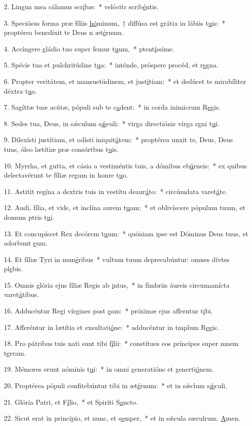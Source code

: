 2. Lingua mea cálamus scr\uline{i}bæ:~* velócitr scrib\uline{é}ntis.\par 
3. Speciósus forma præ fíliis \uline{hó}minum,~† diffúsa est grátia in lábiis t\uline{u}is:~* proptérea benedíxit te Deus n æt\uline{é}rnum.\par 
4. Accíngere gládio tuo super femur t\uline{u}um,~* ptent\uline{í}ssime.\par 
5. Spécie tua et pulchritúdine t\uline{u}a:~* inténde, próspere procéd, et r\uline{e}gna.\par 
6. Propter veritátem, et mansuetúdinem, et just\uline{í}tiam:~* et dedúcet te mirabíliter déxtra t\uline{u}a.\par 
7. Sagíttæ tuæ acútæ, pópuli sub te c\uline{a}dent:~* in corda inimicrum R\uline{e}gis.\par 
8. Sedes tua, Deus, in sǽculum s\uline{ǽ}culi:~* virga directiónis virga rgni t\uline{u}i.\par 
9. Dilexísti justítiam, et odísti iniquit\uline{á}tem:~* proptérea unxit te, Deus, Deus tuus, óleo lætítiæ præ consórtbus t\uline{u}is.\par 
10. Myrrha, et gutta, et cásia a vestiméntis tuis, a dómibus eb\uline{ú}rneis:~* ex quibus delectavérunt te fíliæ regum in honre t\uline{u}o.\par 
11. Astitit regína a dextris tuis in vestítu deaur\uline{á}to:~* circúmdata varet\uline{á}te.\par 
12. Audi, fília, et vide, et inclína aurem t\uline{u}am:~* et oblivíscere pópulum tuum, et domum ptris t\uline{u}i.\par 
13. Et concupíscet Rex decórem t\uline{u}um:~* quóniam ipse est Dóminus Deus tuus, et adorbunt \uline{e}um.\par 
14. Et fíliæ Tyri in mun\uline{é}ribus~* vultum tuum deprecabúntur: omnes dívtes pl\uline{e}bis.\par 
15. Omnis glória ejus fíliæ Regis ab \uline{i}ntus,~* in fímbriis áureis circumamícta varet\uline{á}tibus.\par 
16. Adducéntur Regi vírgines post \uline{e}am:~* próximæ ejus afferntur t\uline{i}bi.\par 
17. Afferéntur in lætítia et exsultati\uline{ó}ne:~* adducéntur in tmplum R\uline{e}gis.\par 
18. Pro pátribus tuis nati sunt tibi f\uline{í}lii:~* constítues eos príncipes super mnem t\uline{e}rram.\par 
19. Mémores erunt nóminis t\uline{u}i:~* in omni generatióne et generti\uline{ó}nem.\par 
20. Proptérea pópuli confitebúntur tibi in æt\uline{é}rnum:~* et in sǽclum s\uline{ǽ}culi.\par 
21. Glória Patri, et F\uline{í}lio,~* et Spiríti S\uline{a}ncto.\par 
22. Sicut erat in princípio, et nunc, et s\uline{e}mper,~* et in sǽcula sæculrum. \uline{A}men.\par 
